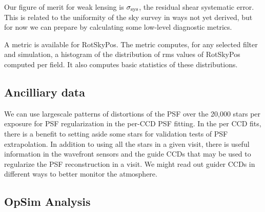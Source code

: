 Our figure of merit for weak lensing is $\sigma_{\rm sys}$, the
residual shear systematic error. This is related to the uniformity of
the sky survey in ways not yet derived, but for now we can prepare by
calculating some low-level diagnostic metrics.

A metric is available for RotSkyPos.  The metric computes, for any
selected filter and simulation, a histogram of the distribution of rms
values of RotSkyPos computed per field. It also computes basic
statistics of these distributions.


\subsection{Ancilliary data}

We can use largescale patterns of distortions of the PSF over the 20,000 stars per exposure for
PSF regularization in the per-CCD PSF fitting. In the per CCD fits, there is a benefit to
setting aside some stars for validation tests of PSF extrapolation.
In addition to using all the stars in a given visit, there is useful information in the
wavefront sensors and the guide CCDs that may be used to regularize the PSF
reconstruction in a visit. We might read out guider CCDs in different ways to better
monitor the atmosphere.


\subsection{OpSim Analysis}




